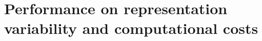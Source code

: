 	



	
	
	
	
	
		
		




		
\section{Performance on representation variability and computational costs} %
		
